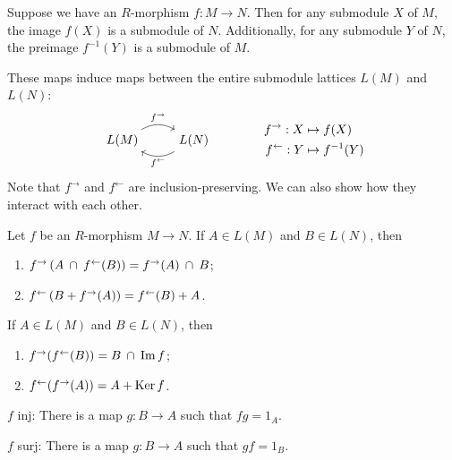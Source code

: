 \documentclass[twoside,10pt]{report}
\begin{document}
\begin{prop}
	Suppose we have an $R$-morphism $f:M\to N$. Then for any submodule $X$ of $M$, the image $f(X)$ is a submodule of $N$. Additionally, for any submodule $Y$ of $N$, the preimage $f^{-1}(Y)$ is a submodule of $ M$.
\end{prop}
These maps induce maps between the entire submodule lattices $L(M)$ and $L(N)$:
\begin{equation*}
	\begin{aligned}[c]
		\begin{tikzcd}
			L(M) \rar[bend left]{f^{\to }} & L(N) \lar[bend left]{f^{\leftarrow}}
		\end{tikzcd}
	\end{aligned}
	\qquad\qquad
	\begin{aligned}[c]
		f^{\to }: X &\mapsto f(X) \\
	f^{\leftarrow}: Y &\mapsto f^{-1}(Y)
	\end{aligned}
\end{equation*}
Note that $f^{\to }$ and $f^{\leftarrow}$ are inclusion-preserving. We can also show how they interact with each other.
\begin{prop}
	Let $f$ be an $R$-morphism $M\to N$. If $A \in L(M)$ and $B \in L(N)$, then
	\begin{enumerate}
		\item $f^{\to }\left( A \operatorname{\;\cap\;} f^{\leftarrow}(B) \right) = f^{\to }(A) \operatorname{\;\cap\;} B$;
		\item $f^{\leftarrow}\left( B + f^{\to }(A) \right) = f^{\leftarrow}(B) + A$.
	\end{enumerate}
\end{prop}
\begin{cor}
	If $A \in L(M)$ and $B \in L(N)$, then
	\begin{enumerate}
		\item $f^{\to }(f^{\leftarrow}(B)) = B \operatorname{\;\cap\;} \operatorname{Im} f$;
		\item $f^{\leftarrow}(f^{\to }(A)) = A + \operatorname{Ker} f$.
	\end{enumerate}
\end{cor}




{\color{blue}
	$f$ inj: There is a map $g:B\to A$ such that $fg = 1_{A}$.

	$f$ surj: There is a map $g:B\to A$ such that $gf = 1_{B}$.
}
\end{document}

